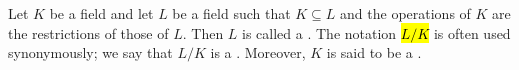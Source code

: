 \begin{definition} \label{definition:extension_of_a_field}
Let $K$ be a field and let $L$ be a field such that $K \subseteq L$ and the operations of $K$ are the restrictions of those of $L$.  
Then $L$ is called a . The notation \hl{$L/K$} is often used synonymously; we say that $L/K$ is a . Moreover, $K$ is said to be a .
\end{definition}